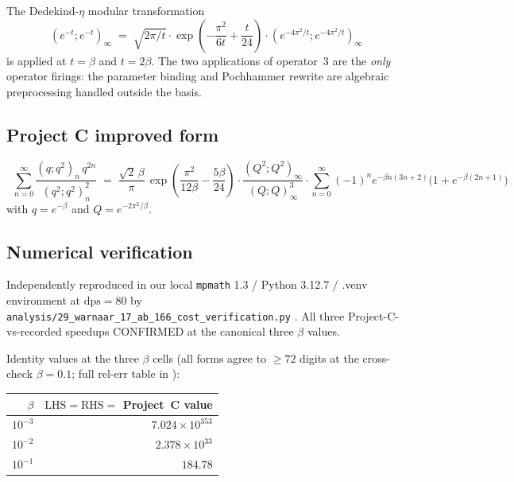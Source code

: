 \documentclass[11pt,reqno]{amsart}
\theoremstyle{definition}
\newcommand{\LHS}{\mathrm{LHS}}
\newcommand{\RHS}{\mathrm{RHS}}
\newcommand{\dps}{\mathrm{dps}}
\begin{document}
The Dedekind-$\eta$ modular transformation
\[
(e^{-t}; e^{-t})_\infty
\;=\; \sqrt{2\pi/t} \cdot \exp\!\left(-\frac{\pi^2}{6t} + \frac{t}{24}\right) \cdot (e^{-4\pi^2/t}; e^{-4\pi^2/t})_\infty
\]
is applied at $t = \beta$ and $t = 2\beta$. The two applications of
operator~3 are the \emph{only} operator firings: the parameter
binding and Pochhammer rewrite are algebraic preprocessing handled
outside the basis.

\subsection{Project C improved form}

\begin{equation}\label{eq:warnaar-improved}
\boxed{\;\;
\sum_{n=0}^\infty \frac{(q;q^2)_n \, q^{2n}}{(q^2;q^2)_n^2}
\;=\; \frac{\sqrt{2}\,\beta}{\pi} \, \exp\!\left(\frac{\pi^2}{12\beta} - \frac{5\beta}{24}\right)
   \cdot \frac{(Q^2; Q^2)_\infty}{(Q; Q)_\infty^3}
   \cdot \sum_{n=0}^\infty (-1)^n e^{-\beta n(3n+2)} \bigl(1 + e^{-\beta(2n+1)}\bigr)
\;\;}
\end{equation}
with $q = e^{-\beta}$ and $Q = e^{-2\pi^2/\beta}$.

\subsection{Numerical verification}\label{sec:warnaar-verification}

Independently reproduced in our local \texttt{mpmath} 1.3 / Python
3.12.7 / .venv environment at $\dps = 80$ by
\verb|analysis/29_warnaar_17_ab_166_cost_verification.py|
\cite[diary~43; commit \texttt{f8a04a3}]{ProjectC}. All three
Project-C-vs-recorded speedups CONFIRMED at the canonical three
$\beta$ values.

Identity values at the three $\beta$ cells (all forms agree to
$\ge 72$ digits at the cross-check $\beta = 0.1$; full rel-err
table in \cite[diary~43]{ProjectC}):
\begin{center}
\begin{tabular}{r r}
\toprule
$\beta$ & $\LHS = \RHS =$ Project~C value \\
\midrule
$10^{-3}$ & $7.024 \times 10^{353}$ \\
$10^{-2}$ & $2.378 \times 10^{33}$ \\
$10^{-1}$ & $184.78$ \\
\bottomrule
\end{tabular}
\end{center}
\end{document}
